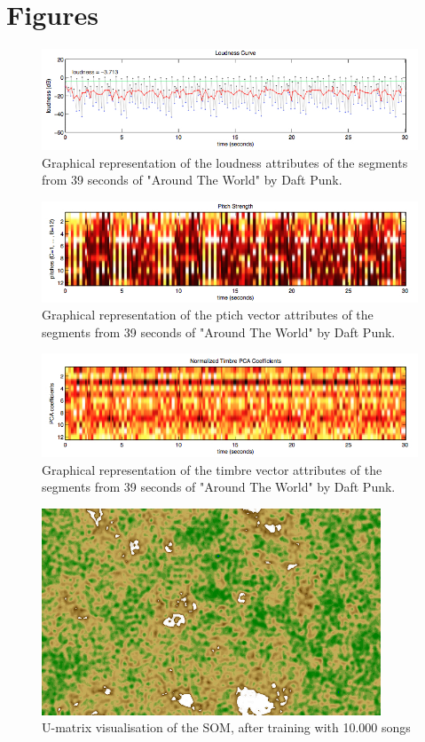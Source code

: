 \section{Figures} %
\label{sec:list_of_figures}

\begin{figure}[h]
    \centering
    \includegraphics[width=\textwidth]{figures/loudness.jpg}
    \caption{Graphical representation of the loudness attributes of the segments from 39 seconds of "Around The World" by Daft Punk.}
    \label{fig:loudness}
\end{figure}

\begin{figure}[h]
    \centering
    \includegraphics[width=\textwidth]{figures/pitch.jpg}
    \caption{Graphical representation of the ptich vector attributes of the segments from 39 seconds of "Around The World" by Daft Punk.}
    \label{fig:pitch}
\end{figure}

\begin{figure}[h]
    \centering
    \includegraphics[width=\textwidth]{figures/timbre.jpg}
    \caption{Graphical representation of the timbre vector attributes of the segments from 39 seconds of "Around The World" by Daft Punk.}
    \label{fig:timbre}
\end{figure}

\begin{figure}[h]
    \centering
    \includegraphics[angle=90, width=0.9\textwidth]{figures/map.jpg}
    \caption{U-matrix visualisation of the SOM, after training with 10.000 songs}
    \label{fig:map}
\end{figure}
